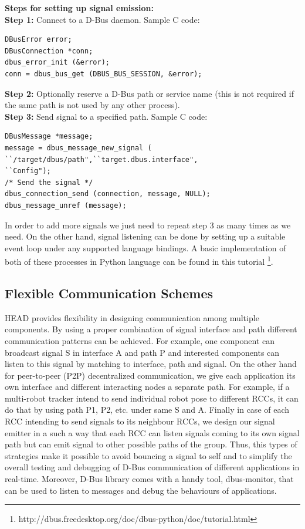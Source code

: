 \documentclass{ifacconf}
\begin{document}
\textbf{Steps for setting up signal emission:}\\
\textbf{Step 1:} Connect to a D-Bus daemon. Sample C code:
\lstset{language=C,basicstyle=\small}
\begin{lstlisting}
DBusError error;
DBusConnection *conn;
dbus_error_init (&error);
conn = dbus_bus_get (DBUS_BUS_SESSION, &error);
\end{lstlisting}
\textbf{Step 2:} Optionally reserve a D-Bus path or service name (this is not required if the same path is not used by any other process).\\
\textbf{Step 3:} Send signal to a specified path. Sample C code:
\begin{lstlisting} 
DBusMessage *message;
message = dbus_message_new_signal (
``/target/dbus/path",``target.dbus.interface",
``Config");
/* Send the signal */
dbus_connection_send (connection, message, NULL);
dbus_message_unref (message);
\end{lstlisting}
In order to add more signals we just need to repeat step 3 as many times as we need. On the other hand, signal listening can be done by setting up a suitable event loop under any supported language bindings. A basic implementation of both of these processes in Python language can be found in this tutorial \footnote{http://dbus.freedesktop.org/doc/dbus-python/doc/tutorial.html}. 
\subsection{Flexible Communication  Schemes}
HEAD provides flexibility in designing communication among multiple components. By using a proper combination of signal interface and path different communication patterns can be achieved. For example, one component can broadcast signal S in interface A and path P and interested components can listen to this signal by matching to interface, path and signal. On the other hand for peer-to-peer (P2P) decentralized communication,  we give each application its own interface and different interacting nodes a separate path.  For example, if a multi-robot tracker intend to send individual robot pose to different RCCs, it can do that by using path P1,  P2, etc. under same S and A. Finally in case of each RCC intending to send signals to its neighbour RCCs, we design our signal emitter in a such a way that each RCC can listen signals coming to its own signal path but can emit  signal to other possible paths of the group. Thus,  this types of strategies  make it possible to avoid bouncing a signal to self and to simplify the overall testing and debugging of D-Bus communication of different applications in real-time. Moreover, D-Bus library comes with a handy tool, dbus-monitor, that can be used to listen to messages and debug the behaviours of applications.
\end{document}
